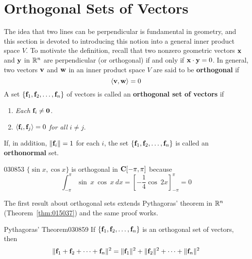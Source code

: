 \section{Orthogonal Sets of Vectors}
\label{sec:10_2}

The idea that two lines can be perpendicular is fundamental in geometry, and this section is devoted to introducing this notion into a general inner product space $V$. To motivate the definition, recall that two nonzero geometric vectors $\textbf{x}$ and $\textbf{y}$ in $\mathbb{R}^n$ are perpendicular (or orthogonal) if and only if $\textbf{x} \cdot \textbf{y} = 0$. In general, two vectors $\textbf{v}$ and $\textbf{w}$ in an inner product space $V$ are said to be \textbf{orthogonal} if
\begin{equation*}
\langle \textbf{v}, \textbf{w} \rangle = 0
\end{equation*}
A set $\{\textbf{f}_{1}, \textbf{f}_{2}, \dots, \textbf{f}_{n}\}$ of vectors is called an \textbf{orthogonal set of vectors} if

\begin{enumerate}
\item \textit{Each} $\textbf{f}_{i} \neq \textbf{0}$.

\item $\langle \textbf{f}_{i}, \textbf{f}_{j}\rangle = 0$ \textit{for all} $i \neq j$.
\end{enumerate}

\noindent If, in addition, $\|\textbf{f}_{i}\| = 1$ for each $i$, the set
$\{\textbf{f}_{1}, \textbf{f}_{2}, \dots, \textbf{f}_{n}\}$ is called an \textbf{orthonormal} set.

\begin{example}{}{030853}
$\{\sin x, \cos x\}$ is orthogonal in $\textbf{C}[-\pi, \pi]$ because
\begin{equation*}
\int_{-\pi}^{\pi} \sin\ x\ \cos\ x\ dx = \left[ - \frac{1}{4} \cos\ 2x \right]_{-\pi}^{\pi} = 0
\end{equation*}
\end{example}

The first result about orthogonal sets extends Pythagoras' theorem in $\mathbb{R}^n$ (Theorem~\ref{thm:015037}) and the same proof works.

\begin{theorem}{Pythagoras' Theorem}{030859}
If $\{\textbf{f}_{1}, \textbf{f}_{2}, \dots, \textbf{f}_{n}\}$ is an orthogonal set of vectors, then
\begin{equation*}
\| \textbf{f}_1 + \textbf{f}_2 + \dots + \textbf{f}_n \| ^2 =
\| \textbf{f}_1 \| ^2 +
\| \textbf{f}_2 \| ^2 + \dots +
\| \textbf{f}_n \| ^2
\end{equation*}
\vspace*{-2em}
\end{theorem}

